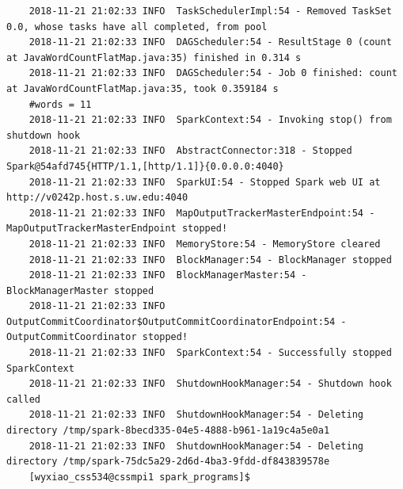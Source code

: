 \documentclass[11pt, letterpaper]{article}
\begin{document}
\begin{lstlisting}
	2018-11-21 21:02:33 INFO  TaskSchedulerImpl:54 - Removed TaskSet 0.0, whose tasks have all completed, from pool
	2018-11-21 21:02:33 INFO  DAGScheduler:54 - ResultStage 0 (count at JavaWordCountFlatMap.java:35) finished in 0.314 s
	2018-11-21 21:02:33 INFO  DAGScheduler:54 - Job 0 finished: count at JavaWordCountFlatMap.java:35, took 0.359184 s
	#words = 11
	2018-11-21 21:02:33 INFO  SparkContext:54 - Invoking stop() from shutdown hook
	2018-11-21 21:02:33 INFO  AbstractConnector:318 - Stopped Spark@54afd745{HTTP/1.1,[http/1.1]}{0.0.0.0:4040}
	2018-11-21 21:02:33 INFO  SparkUI:54 - Stopped Spark web UI at http://v0242p.host.s.uw.edu:4040
	2018-11-21 21:02:33 INFO  MapOutputTrackerMasterEndpoint:54 - MapOutputTrackerMasterEndpoint stopped!
	2018-11-21 21:02:33 INFO  MemoryStore:54 - MemoryStore cleared
	2018-11-21 21:02:33 INFO  BlockManager:54 - BlockManager stopped
	2018-11-21 21:02:33 INFO  BlockManagerMaster:54 - BlockManagerMaster stopped
	2018-11-21 21:02:33 INFO  OutputCommitCoordinator$OutputCommitCoordinatorEndpoint:54 - OutputCommitCoordinator stopped!
	2018-11-21 21:02:33 INFO  SparkContext:54 - Successfully stopped SparkContext
	2018-11-21 21:02:33 INFO  ShutdownHookManager:54 - Shutdown hook called
	2018-11-21 21:02:33 INFO  ShutdownHookManager:54 - Deleting directory /tmp/spark-8becd335-04e5-4888-b961-1a19c4a5e0a1
	2018-11-21 21:02:33 INFO  ShutdownHookManager:54 - Deleting directory /tmp/spark-75dc5a29-2d6d-4ba3-9fdd-df843839578e
	[wyxiao_css534@cssmpi1 spark_programs]$
	
	\end{lstlisting}
	
\end{document}

